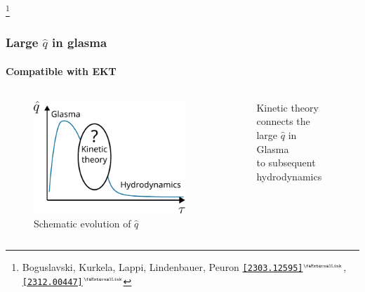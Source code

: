 \documentclass[aspectratio=169,11pt,usenames,dvipsnames]{beamer}
\renewcommand{\thefootnote}{\color{customblue}\faPaperPlaneO}
\newcommand\blfootnote[1]{%
  \begingroup
  \renewcommand\thefootnote{}\footnote{#1}%
  \addtocounter{footnote}{-1}%
  \endgroup
}
\begin{document}
\begin{frame}
    \blfootnote{\scriptsize Boguslavski, Kurkela, Lappi, Lindenbauer, Peuron \href{https://arxiv.org/abs/2303.12595}{{\color{ForestGreen}\texttt{[2303.12595]}$^\text{\tiny\faExternalLink}$}}, \href{https://arxiv.org/abs/2312.00447}{{\color{ForestGreen}\texttt{[2312.00447]}$^\text{\tiny\faExternalLink}$}}}
\end{frame}


\begin{frame}[noframenumbering]
    \frametitle{Large $\hat{q}$ in glasma}
    \framesubtitle{Compatible with EKT}
    \vspace{-0.4cm}
    \begin{columns}[onlytextwidth,t]
        \begin{figure}[!hbt]
            \centering
            \captionsetup{justification=centering}
            \caption{Schematic evolution of $\hat{q}$}\vspace{-0.3cm}
            \includegraphics[width=0.78\columnwidth]{images/qhat_schematic_evolution.pdf}\vspace{-0.3cm}
        \end{figure}
        \begin{figure}[!hbt]
            \centering
            \captionsetup{justification=centering}
            \caption{{\color{ForestGreen}Kinetic theory} connects the large $\hat{q}$ in {\color{Dandelion}Glasma}\\ to subsequent {\color{Periwinkle}hydrodynamics}}\vspace{-0.2cm}

\end{figure}
\end{columns}
\end{frame}
\end{document}
